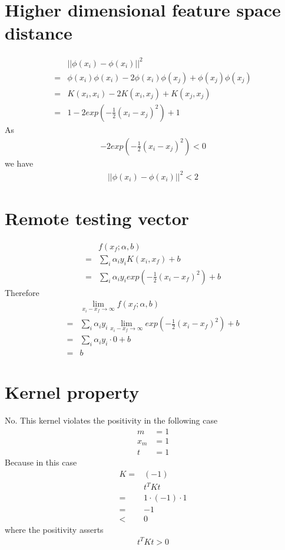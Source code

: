 \documentclass[12pt]{article}
\begin{document}
\section{Higher dimensional feature space distance}
\begin{align}
  & ||\phi(x_i)-\phi(x_i)||^2 \\
  =& \phi(x_i) \phi(x_i) - 2\phi(x_i) \phi(x_j) + \phi(x_j) \phi(x_j) \\
  =& K(x_i, x_i) -2 K(x_i, x_j) + K(x_j, x_j) \\
  =& 1 -2 exp(-\frac{1}{2} (x_i - x_j)^2) + 1
\end{align}
As
\begin{align}
  -2 exp(-\frac{1}{2} (x_i - x_j)^2) < 0
\end{align}
we have
\begin{align}
  ||\phi(x_i)-\phi(x_i)||^2 < 2
\end{align}
\section{Remote testing vector}
\begin{align}
  & f(x_f; \alpha,b) \\
  =& \sum_{i} \alpha_i y_i K(x_i, x_f) + b \\
  =& \sum_{i} \alpha_i y_i exp(-\frac{1}{2} (x_i - x_f)^2) + b
\end{align}
Therefore
\begin{align}
  & \lim_{x_i-x_f \to \infty} f(x_f; \alpha,b) \\
  =& \sum_{i} \alpha_i y_i \lim_{x_i-x_f \to \infty} exp(-\frac{1}{2} (x_i - x_f)^2) + b \\
  =& \sum_{i} \alpha_i y_i \cdot 0 + b \\
  =& b
\end{align}
\section{Kernel property}
No. This kernel violates the positivity in the following case
\begin{align}
  m &= 1 \\
  x_m &= 1 \\
  t &= 1
\end{align}
Because in this case
\begin{align}
  K =& (-1) \\
  & t^T K t \\
  =& 1 \cdot (-1) \cdot 1 \\
  =& -1 \\
  <& 0
\end{align}
where the positivity asserts
\begin{align}
   t^T K t > 0
\end{align}
\end{document}
